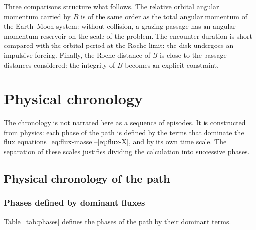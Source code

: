 \documentclass[11pt,a4paper,openany]{report}
\begin{document}
\begin{controle}
Three comparisons structure what follows. The relative orbital angular momentum carried by $B$ is
of the same order as the total angular momentum of the Earth--Moon system: without collision, a
grazing passage has an angular-momentum reservoir on the scale of the problem. The encounter
duration is short compared with the orbital period at the Roche limit: the disk undergoes an
impulsive forcing. Finally, the Roche distance of $B$ is close to the passage distances considered:
the integrity of $B$ becomes an explicit constraint.
\end{controle}

\part{Physical chronology}
\label{part:chronologie}

\noindent
The chronology is not narrated here as a sequence of episodes. It is constructed from physics: each
phase of the path is defined by the terms that dominate the flux equations~\eqref{eq:flux-masse}--\eqref{eq:flux-X},
and by its own time scale. The separation of these scales justifies dividing the calculation into
successive phases.

\chapter{Physical chronology of the path}
\label{ch:chronologie}

\section{Phases defined by dominant fluxes}

Table~\ref{tab:phases} defines the phases of the path by their dominant terms.
\end{document}
